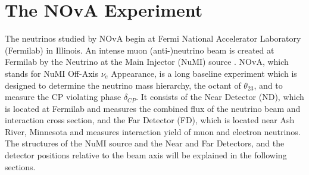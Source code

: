 \chapter{The NOvA Experiment}
\label{experiment_chapter}

The neutrinos studied by NOvA begin at Fermi National Accelerator Laboratory (Fermilab) 
in Illinois. An intense muon (anti-)neutrino beam is created at Fermilab by the Neutrino 
at the Main Injector (NuMI) source \cite{numi_paper}. NOvA, which stands for NuMI Off-Axis 
$\nu_e$ Appearance, is a long baseline experiment which is designed to determine the neutrino 
mass hierarchy, the octant of $\theta_{23}$, and to measure the CP violating phase $\delta_{CP}$. It 
consists of the Near Detector (ND), which is located at Fermilab and measures the combined flux of 
the neutrino beam and interaction cross section, and the Far Detector (FD), which is located near 
Ash River, Minnesota and measures interaction yield 
of muon and electron neutrinos. The structures of the NuMI source and the Near and 
Far Detectors, and the detector positions relative to the beam axis will be explained in 
the following sections.


